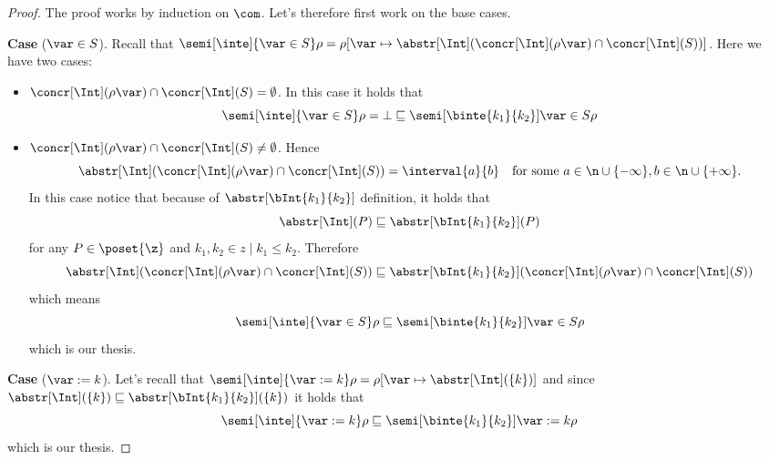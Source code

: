 \begin{proof}
  The proof works by induction on \(\com\). Let's therefore first work
  on the base cases.

  \medskip

  \noindent
  \textbf{Case} (\(\var \in S\)).
  Recall that
  \(\semi[\inte]{\var\in S}\rho = \rho[\var \mapsto
  {\abstr[\Int](\concr[\Int](\rho\var) \cap
    \concr[\Int](S))}]\). Here we have two cases:
  \begin{itemize}
  \item \({\concr[\Int](\rho\var) \cap \concr[\Int](S)} =
    \emptyset\). In this case it holds that
    \begin{equation*}
      \semi[\inte]{\var\in S}\rho = \bot \sqsubseteq \semi[\binte{k_1}{k_2}]{\var\in S}\rho
    \end{equation*}
    
  \item
    \({\concr[\Int](\rho\var) \cap \concr[\Int](S)} \neq \emptyset\).
    Hence
    \begin{equation*}
      \abstr[\Int](\concr[\Int](\rho\var) \cap \concr[\Int](S)) = \interval{a}{b} \quad \text{for some }
      {a \in \n \cup \{-\infty\}}, {b \in \n\cup\{+\infty\}}.
    \end{equation*}
    In
    this case notice that because of \(\abstr[\bInt{k_1}{k_2}]\)
    definition, it holds that
    \begin{equation*}
      \abstr[\Int](P) \sqsubseteq \abstr[\bInt{k_1}{k_2}](P)
    \end{equation*}
    for any \(P \in \poset{\z}\) and
    \(k_1, k_2 \in z \mid k_1 \leq k_2\). Therefore
    \begin{equation*}
      \abstr[\Int](\concr[\Int](\rho\var) \cap \concr[\Int](S)) \sqsubseteq
      \abstr[\bInt{k_1}{k_2}](\concr[\Int](\rho\var) \cap \concr[\Int](S))
    \end{equation*}
    which means
    \begin{equation*}
      {\semi[\inte]{\var\in S}\rho} \sqsubseteq {\semi[\binte{k_1}{k_2}]{\var\in S}\rho}
    \end{equation*}
    which is our thesis.
  \end{itemize}

  \medskip

  \noindent
  \textbf{Case} (\(\var := k\)).
  Let's recall that
  \({\semi[\inte]{\var := k}\rho = \rho[\var \mapsto
    \abstr[\Int](\{k\})]}\) and since
  \({\abstr[\Int](\{k\})} \sqsubseteq {\abstr[\bInt{k_1}{k_2}](\{k\})}\) it holds
  that
  \begin{equation*}
    \semi[\inte]{\var := k}\rho \sqsubseteq \semi[\binte{k_1}{k_2}]{\var := k}\rho
  \end{equation*}
  which is our thesis.


\end{proof}

